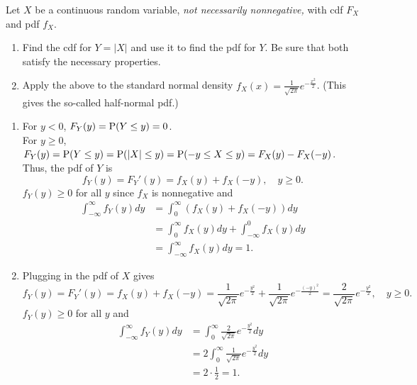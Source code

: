 \documentclass[12pt]{article}
\newcommand{\Prob}{{\rm P}}
\newenvironment{problem}[2][Problem]{\begin{trivlist}
\item[\hskip \labelsep {\bfseries #1}\hskip \labelsep {\bfseries #2.}]}
{\end{trivlist}}
\begin{document}
\begin{problem}{7}
  Let $X$ be a continuous random variable, 
  \textit{not necessarily nonnegative,}
  with cdf $F_X$ and pdf $f_X$.
  \begin{enumerate}
    \item Find the cdf for $Y = |X|$ and use it to find the pdf for $Y$. 
    Be sure that both satisfy the necessary properties.
    \item Apply the above to the standard normal density 
    $f_X (x) = \frac{1}{\sqrt{2\pi}} e^{-\frac{x^2}{2}}$. 
    (This gives the so-called half-normal pdf.)
  \end{enumerate}
  \begin{enumerate}
    \item For $y < 0$, $F_Y(y) = \Prob(Y \le y) = 0$.\\
    For $y \ge 0$, $F_Y(y) = \Prob(Y \le y) = \Prob(|X| \le y) 
    = \Prob(-y \le X \le y) = F_X(y) - F_X(-y)$.
    Thus, the pdf of $Y$ is
    \[
      f_Y(y) = F_Y'(y) = f_X(y) + f_X(-y), \quad y \ge 0.
    \]
    $f_Y(y) \ge 0$ for all $y$ since $f_X$ is nonnegative and
    \[
    \begin{aligned}
      \int_{-\infty}^\infty f_Y(y) dy &= \int_0^\infty (f_X(y) + f_X(-y)) dy \\
      &= \int_0^\infty f_X(y) dy + \int_{-\infty}^0 f_X(y) dy \\
      &= \int_{-\infty}^\infty f_X(y) dy = 1.
    \end{aligned}
    \]
    \item Plugging in the pdf of $X$ gives
    \[
      f_Y(y) = F_Y'(y) = f_X(y) + f_X(-y) =
      \frac{1}{\sqrt{2\pi}} e^{-\frac{y^2}{2}} +
      \frac{1}{\sqrt{2\pi}} e^{-\frac{(-y)^2}{2}} =
      \frac{2}{\sqrt{2\pi}} e^{-\frac{y^2}{2}}, \quad y \ge 0.
    \]
    $f_Y(y) \ge 0$ for all $y$ and
    \[
    \begin{aligned}
      \int_{-\infty}^\infty f_Y(y) dy 
      &= \int_0^\infty \frac{2}{\sqrt{2\pi}} e^{-\frac{y^2}{2}} dy \\
      &= 2 \int_0^\infty \frac{1}{\sqrt{2\pi}} e^{-\frac{y^2}{2}} dy \\
      &= 2 \cdot \frac{1}{2} = 1.
    \end{aligned}
    \]
  \end{enumerate}
\end{problem}
\end{document}
